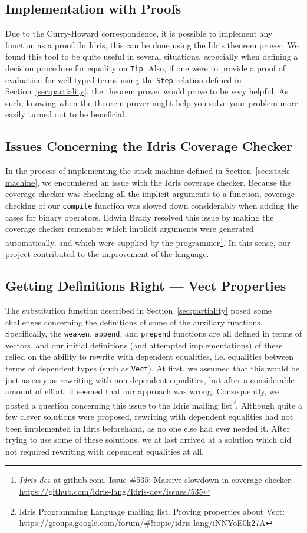 \subsection{Implementation with Proofs}
Due to the Curry-Howard correspondence, it is possible to implement any function as a proof. In Idris, this can be done using the Idris theorem prover. We found this tool to be quite useful in several situations, especially when defining a decision procedure for equality on \texttt{Tip}. Also, if one were to provide a proof of evaluation for well-typed terms using the \texttt{Step} relation defined in Section~\ref{sec:partiality}, the theorem prover would prove to be very helpful. As such, knowing when the theorem prover might help you solve your problem more easily turned out to be beneficial.

\subsection{Issues Concerning the Idris Coverage Checker}
In the process of implementing the stack machine defined in Section~\ref{sec:stack-machine}, we encountered an issue with the Idris coverage checker. Because the coverage checker was checking all the implicit arguments to a function, coverage checking of our \texttt{compile} function was slowed down considerably when adding the cases for binary operators. Edwin Brady resolved this issue by making the coverage checker remember which implicit arguments were generated automatically, and which were supplied by the programmer\footnote{\emph{Idris-dev} at github.com. Issue \#535: Massive slowdown in coverage checker. \url{https://github.com/idris-lang/Idris-dev/issues/535}}. In this sense, our project contributed to the improvement of the language.
 
\subsection{Getting Definitions Right --- Vect Properties}
The substitution function described in Section~\ref{sec:partiality} posed some challenges concerning the definitions of some of the auxiliary functions. Specifically, the \texttt{weaken}, \texttt{append}, and \texttt{prepend} functions are all defined in terms of vectors, and our initial definitions (and attempted implementations) of these relied on the ability to rewrite with dependent equalities, i.e. equalities between terms of dependent types (such as \texttt{Vect}). At first, we assumed that this would be just as easy as rewriting with non-dependent equalities, but after a considerable amount of effort, it seemed that our approach was wrong. Consequently, we posted a question concerning this issue to the Idris mailing list\footnote{Idris Programming Language mailing list. Proving properties about Vect: \url{https://groups.google.com/forum/#!topic/idris-lang/iNNYoE0k27A}}. Although quite a few clever solutions were proposed, rewriting with dependent equalities had not been implemented in Idris beforehand, as no one else had ever needed it. After trying to use some of these solutions, we at last arrived at a solution which did not required rewriting with dependent equalities at all.
